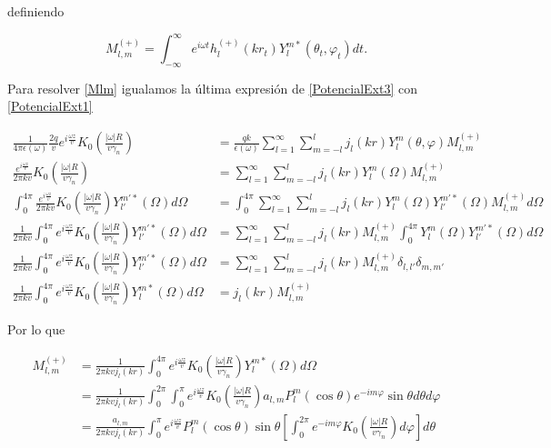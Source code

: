 \documentclass[a4paper,10pt]{article}
\begin{document}
definiendo 

\begin{equation}
M_{l,m}^{(+)}=\int_{-\infty}^{\infty}e^{i\omega t} h_l^{(+)}(kr_t)Y_l^{m*}(\theta_t,\varphi_t) dt.
\label{Mlm}
\end{equation}

Para resolver \eqref{Mlm} igualamos la última expresión de \eqref{PotencialExt3} con \eqref{PotencialExt1}

\begin{equation}
\begin{aligned}
\frac{1}{4\pi\epsilon(\omega)}\frac{2q}{v}e^{i\frac{\omega z}{v}}K_0\left( \frac{|\omega|R}{v\gamma_n} \right)	&=	\frac{qk}{\epsilon(\omega)}\sum_{l=1}^{\infty}\sum_{m=-l}^l j_l(kr)Y_l^m(\theta,\varphi) M_{l,m}^{(+)}	\\
\frac{e^{i\frac{\omega z}{v}}}{2\pi kv}K_0\left( \frac{|\omega|R}{v\gamma_n} \right)	&=	\sum_{l=1}^{\infty}\sum_{m=-l}^l j_l(kr)Y_l^m(\Omega) M_{l,m}^{(+)}	\\
\int_{0}^{4\pi}\frac{e^{i\frac{\omega z}{v}}}{2\pi kv}K_0\left( \frac{|\omega|R}{v\gamma_n} \right) Y_{l'}^{m'*}(\Omega) d\Omega		&=	\int_{0}^{4\pi} \sum_{l=1}^{\infty}\sum_{m=-l}^l j_l(kr)Y_l^m(\Omega)  Y_{l'}^{m'*}(\Omega)  M_{l,m}^{(+)} d\Omega	\\
\frac{1}{2\pi kv}\int_{0}^{4\pi}e^{i\frac{\omega z}{v}}K_0\left( \frac{|\omega|R}{v\gamma_n} \right) Y_{l'}^{m'*}(\Omega) d\Omega	&=	\sum_{l=1}^{\infty}\sum_{m=-l}^l j_l(kr)M_{l,m}^{(+)} \int_{0}^{4\pi} Y_l^m(\Omega)  Y_{l'}^{m'*}(\Omega) d\Omega	\\
\frac{1}{2\pi kv}\int_{0}^{4\pi}e^{i\frac{\omega z}{v}}K_0\left( \frac{|\omega|R}{v\gamma_n} \right) Y_{l'}^{m'*}(\Omega) d\Omega	&=	\sum_{l=1}^{\infty}\sum_{m=-l}^l j_l(kr)M_{l,m}^{(+)} \delta_{l,l'}\delta_{m,m'}	\\
\frac{1}{2\pi kv}\int_{0}^{4\pi}e^{i\frac{\omega z}{v}}K_0\left( \frac{|\omega|R}{v\gamma_n} \right) Y_l^{m*}(\Omega) d\Omega	&=  j_l(kr)M_{l,m}^{(+)}
\end{aligned}
\end{equation}

Por lo que

\begin{equation}
\begin{aligned}
M_{l,m}^{(+)}	&=	\frac{1}{2\pi kv j_l(kr)}\int_{0}^{4\pi}e^{i\frac{\omega z}{v}}K_0\left( \frac{|\omega|R}{v\gamma_n} \right) Y_l^{m*}(\Omega) d\Omega	\\
	&=\frac{1}{2\pi kv j_l(kr)}\int_{0}^{2\pi}\int_{0}^{\pi}e^{i\frac{\omega z}{v}}K_0\left( \frac{|\omega|R}{v\gamma_n} \right)  a_{l,m}P_l^m(\cos\theta)e^{-im\varphi} \sin\theta d\theta d\varphi 	\\
	&= \frac{a_{l,m}}{2\pi kv j_l(kr)}\int_{0}^{\pi}e^{i\frac{\omega z}{v}}P_l^m(\cos\theta)\sin\theta\left[\int_{0}^{2\pi}e^{-im\varphi}K_0\left( \frac{|\omega|R}{v\gamma_n} \right)d\varphi \right]d\theta	\\
\end{aligned}
\label{Eq2.33}
\end{equation}	
\end{document}
